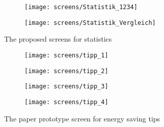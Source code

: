 \begin{figure}[h]
	\centering
	\begin{subfigure}[b]{0.24\columnwidth}
		\centering
		\texttt{[image: screens/Statistik\_1234]}
		\label{fig:statistik:professional}
	\end{subfigure}
	\begin{subfigure}[b]{0.24\columnwidth}
		\centering
		\texttt{[image: screens/Statistik\_Vergleich]}
		\label{fig:statistik:optimizer}
	\end{subfigure}
	\caption{The proposed screens for statistics}
	\label{fig:statistik} %
\end{figure}

\begin{figure}[h]
	\centering
	\begin{subfigure}[b]{0.24\columnwidth}
		\centering
		\texttt{[image: screens/tipp\_1]}
		\label{fig:tipps:professional}
	\end{subfigure}
	\begin{subfigure}[b]{0.24\columnwidth}
		\centering
		\texttt{[image: screens/tipp\_2]}
		\label{fig:tipps:optimizer}
	\end{subfigure}
	\begin{subfigure}[b]{0.24\columnwidth}
		\centering
		\texttt{[image: screens/tipp\_3]}
		\label{fig:tipps:indifferent}
	\end{subfigure}
	\begin{subfigure}[b]{0.24\columnwidth}
		\centering
		\texttt{[image: screens/tipp\_4]}
		\label{fig:tipps:hedonist}
	\end{subfigure}
	\caption{The paper prototype screen for energy saving tips}
	\label{fig:tipps} %
\end{figure}

